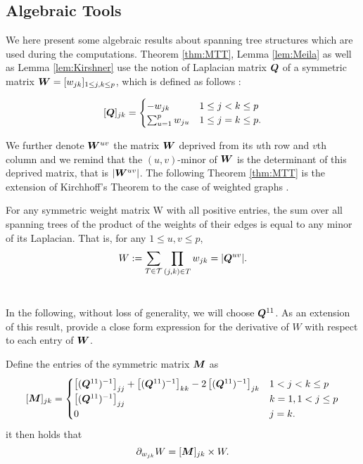  \subsection{Algebraic Tools} \label{app:tools}
 We here present some algebraic results about spanning tree structures which are used during the computations. Theorem \ref{thm:MTT}, Lemma \ref{lem:Meila} as well as Lemma \ref{lem:Kirshner} use the notion of Laplacian matrix  ${\boldsymbol{Q}}$ of a symmetric matrix ${\boldsymbol{W}}=[w_{jk} ]_{1\leq j,k\leq p}$, which is defined as follows :
 
\[
 [{\boldsymbol{Q}}]_{jk}  =\begin{cases}
    -w_{jk}  & 1\leq j<k \leq p\\
    \sum_{u=1}^p w_{ju} & 1\leq j=k \leq p.
    \end{cases}
\]
 
We further denote ${\boldsymbol{W}}^{uv}$ the matrix ${\boldsymbol{W}}$ deprived from its $u$th row and $v$th column and we remind that the $(u, v)$-minor of ${\boldsymbol{W}}$ is the determinant of this deprived matrix, that is $|{\boldsymbol{W}}^{uv}|$.
The following Theorem \ref{thm:MTT} is the extension of Kirchhoff's Theorem to the case of weighted graphs \citep{matrixtree,MeilaJaak}.\\
\begin{theorem} \label{thm:MTT}
    For any symmetric weight matrix W with all positive entries, the sum over all spanning trees of the product of the weights of their edges is equal to any minor of its Laplacian. That is, for any $1 \leq u, v \leq p$,
   \[
    W := \sum_{T\in\mathcal{T}} \prod_{(j, k)\in T} w_{jk} = |{\boldsymbol{Q}}^{uv}|.
    \]\\
\end{theorem}    

In the following, without loss of generality, we will choose ${\boldsymbol{Q}}^{11}$. As an extension of this result, \cite{MeilaJaak} provide a close form expression for the derivative of $W$ with respect to each entry of ${\boldsymbol{W}}$. 

\begin{lemma}  \label{lem:Meila}
    Define the entries of the symmetric matrix ${\boldsymbol{M}}$ as
 \[    
 [{\boldsymbol{M}}]_{jk} =\begin{cases}
    \left[({\boldsymbol{Q}}^{11})^{-1}\right]_{jj} + \left[({\boldsymbol{Q}}^{11})^{-1}\right]_{kk} -2\left[({\boldsymbol{Q}}^{11})^{-1}\right]_{jk} & 1< j<k \leq p\\
    \left[({\boldsymbol{Q}}^{11})^{-1}\right]_{jj} & k=1, 1< j \leq p  \\
    0 &  j=k .
    \end{cases}
\]
it then holds that $$\partial_{w_{jk}} W = [{\boldsymbol{M}}]_{jk}  \times W.$$\\
\end{lemma}

